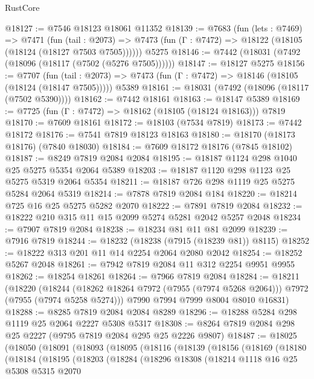 \begin{lexlean}{RustCore}
\begin{coremodule}
@18127 := @7546 @18123 @18061 @11352
@18139 := @7683
    (fun (lets : @7469) =>
    @7471
      (fun (tail : @2073) =>
      @7473 (fun (Γ : @7472) => @18122 (@18105 (@18124 (@18127 @7503 @7505))))))
    @5275
@18146 := @7442 (@18031 (@7492 (@18096 (@18117 (@7502 (@5276 @7505))))))
@18147 := @18127 @5275
@18156 := @7707
    (fun (tail : @2073) => @7473 (fun (Γ : @7472) => @18146 (@18105 (@18124 (@18147 @7505)))))
    @5389
@18161 := @18031 (@7492 (@18096 (@18117 (@7502 @5390))))
@18162 := @7442 @18161
@18163 := @18147 @5389
@18169 := @7725 (fun (Γ : @7472) => @18162 (@18105 (@18124 @18163))) @7819
@18170 := @7609 @18161
@18172 := @18103 (@7534 @7819)
@18173 := @7442 @18172
@18176 := @7541 @7819 @18123 @18163
@18180 := @18170 (@18173 @18176) (@7840 @18030)
@18184 := @7609 @18172 @18176 (@7845 @18102)
@18187 := @8249 @7819 @2084 @2084
@18195 := @18187 @1124 @298 @1040 @25 @5275 @5354 @2064 @5389
@18203 := @18187 @1120 @298 @1123 @25 @5275 @5319 @2064 @5354
@18211 := @18187 @726 @298 @1119 @25 @5275 @5284 @2064 @5319
@18214 := @7878 @7819 @2084 @184
@18220 := @18214 @725 @16 @25 @5275 @5282 @2070
@18222 := @7891 @7819 @2084
@18232 := @18222 @210 @315 @11 @15 @2099 @5274 @5281 @2042 @5257 @2048
@18234 := @7907 @7819 @2084
@18238 := @18234 @81 @11 @81 @2099
@18239 := @7916 @7819
@18244 := @18232 (@18238 (@7915 (@18239 @81)) @8115)
@18252 := @18222 @313 @201 @11 @14 @2254 @2064 @2080 @2042
@18254 := @18252 @5267 @2048
@18261 := @7942 @7819 @2084 @11 @312 @2254 @9951 @9955
@18262 := @18254 @18261
@18264 := @7966 @7819 @2084
@18284 := @18211
    (@18220
      (@18244 (@18262 @18264 @7972 (@7955 (@7974 @5268 @2064))) @7972 (@7955 (@7974 @5258 @5274)))
      @7990
      @7994
      @7999
      @8004
      @8010
      @16831)
@18288 := @8285 @7819 @2084 @2084 @8289
@18296 := @18288 @5284 @298 @1119 @25 @2064 @2227 @5308 @5317
@18308 := @8264 @7819 @2084 @298 @25 @2227 (@9795 @7819 @2084 @295 @25 @2226 @9807)
@18487 := @18025
    (@18050
      (@18091
        (@18093
          (@18095
            (@18116
              (@18139
                (@18156
                  (@18169
                    (@18180
                      (@18184
                        (@18195
                          (@18203
                            (@18284
                              (@18296
                                @18308
                                (@18214
                                  @1118
                                  @16
                                  @25
                                  @5308
                                  @5315
                                  @2070

\end{coremodule}
\end{lexlean}
